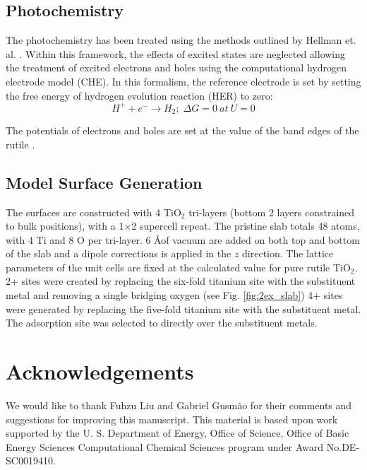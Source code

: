 \subsection{Photochemistry}
\label{sec:PEC_methods}
The photochemistry has been treated using the methods outlined by Hellman et. al. \cite{Hellman2017}. Within this framework, the effects of excited states are neglected allowing the treatment of excited electrons and holes using the computational hydrogen electrode model (CHE). In this formalism, the reference electrode is set by setting the free energy of hydrogen evolution reaction (HER) to zero:
\begin{equation}
    H^+ + e^- \rightarrow H_2;\; \Delta G = 0\:at\: U = 0
\end{equation}

The potentials of electrons and holes are set at the value of the band edges of the rutile \cite{Nozik_1996}.

\subsection{Model Surface Generation}
 The surfaces are constructed with 4 TiO$_2$ tri-layers (bottom 2 layers constrained to bulk positions), with a 1$\times$2 supercell repeat. The pristine slab totals 48 atoms, with 4 Ti and 8 O per tri-layer. 6 \AA  of vacuum are added on both top and bottom of the slab and a dipole corrections is applied in the $z$ direction\cite{Dipole_paper}. The lattice parameters of the unit cells are fixed at the calculated value for pure rutile TiO$_2$. 2+ sites were created by replacing the six-fold titanium site with the substituent metal and removing a single bridging oxygen (see Fig. \ref{fig:2ex_slab}) 4+ sites were generated by replacing the five-fold titanium site with the substituent metal. The adsorption site was selected to directly over the substituent metals. 

\section{Acknowledgements}
We would like to thank Fuhzu Liu and Gabriel Gusm\~ao for their comments and suggestions for improving this manuscript. This material is based upon work supported by the U. S. Department of Energy, Office of Science, Office of Basic Energy Sciences Computational Chemical Sciences program under Award No.DE-SC0019410. 

%

\appendix
%


